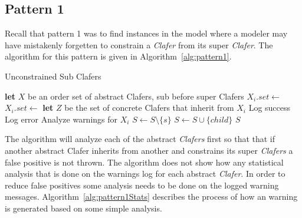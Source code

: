 \documentclass[10pt,oneside]{IEEEtran}
\begin{document}
\subsection{Pattern 1}
Recall that pattern 1 was to find instances in the model where a modeler may have mistakenly forgetten to constrain a \textit{Clafer} from its super \textit{Clafer}. The algorithm for this pattern is given in Algorithm~\ref{alg:pattern1}.

\begin{algorithm}[H]
\caption{Unconstrained Sub Clafers}\label{alg:pattern1}
\begin{algorithmic}[1]
  \State \textbf{let} $X$ be an order set of abstract Clafers, sub before super Clafers
      \State $X_i.set \gets$ 
    \Else
      \State $X_i.set \gets$ 
    \EndIf
  \EndFor
    \State \textbf{let} $Z$ be the set of concrete Clafers that inherit from $X_i$
          \State Log success
        \Else
          \State Log error
        \EndIf
      \EndFor
      \State Analyze warnings for $X_i$
    \EndFor
  \EndFor
\EndProcedure
{}
      \State $S \gets S \setminus \{s\}$
    \EndIf
   \EndFor
      \State $S \gets S \cup \{child\}$
    \EndIf
   \EndFor
   \State \Return $S$
\EndProcedure
\end{algorithmic}
\end{algorithm}

The algorithm will analyze each of the abstract \textit{Clafers} first so that that if another abstract Clafer inherits from another and constrains its super \textit{Clafers} a false positive is not thrown. The algorithm does not show how any statistical analysis that is done on the warnings log for each abstract \textit{Clafer}. In order to reduce false positives some analysis needs to be done on the logged warning messages. Algorithm~\ref{alg:pattern1Stats} describes the process of how an warning is generated based on some simple analysis.
\end{document}
